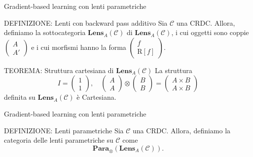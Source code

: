 \documentclass{beamer}
\begin{document}
\begin{frame}{Gradient-based learning con lenti parametriche}
    \begin{block}{DEFINIZIONE: Lenti con backward pass additivo}
        Sia $\mathcal{C}$ una CRDC. Allora, definiamo la sottocategoria $\mathbf{Lens}_A(\mathcal{C})$ di $\mathbf{Lens}_A(\mathcal{C})$, i cui oggetti sono coppie $\left(\begin{smallmatrix} A \\ A' \end{smallmatrix}\right)$ e i cui morfismi hanno la forma $\left(\begin{smallmatrix} f \\ \mathrm{R}[f] \end{smallmatrix}\right)$.
    \end{block}

    \begin{block}{TEOREMA: Struttura cartesiana di $\mathbf{Lens}_A(\mathcal{C})$}
        La struttura
        \[I = \left(\begin{smallmatrix} 1 \\ 1 \end{smallmatrix}\right), \quad \left(\begin{smallmatrix} A \\ A \end{smallmatrix}\right) \otimes \left(\begin{smallmatrix} B \\ B \end{smallmatrix}\right) = \left(\begin{smallmatrix} A \times B \\ A \times B \end{smallmatrix}\right)\]
        definita su $\mathbf{Lens}_A(\mathcal{C})$ è Cartesiana.
    \end{block}
\end{frame}

\begin{frame}{Gradient-based learning con lenti parametriche}
    \begin{block}{DEFINIZIONE: Lenti parametriche}
        Sia $\mathcal{C}$ una CRDC. Allora, definiamo la categoria delle lenti parametriche su $\mathcal{C}$ come \[\mathbf{Para}_{\otimes}(\mathbf{Lens}_A(\mathcal{C})).\]
    \end{block}

    \vspace{1cm}
\end{frame}
\end{document}
